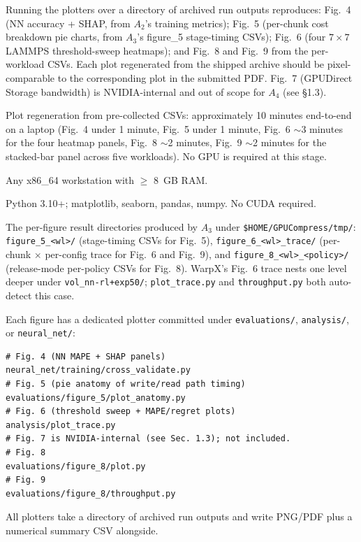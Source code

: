 \documentclass[conference]{IEEEtran}
\begin{document}
Running the plotters over a directory of archived run outputs
reproduces:
Fig.~4 (NN accuracy + SHAP, from $A_2$'s training metrics);
Fig.~5 (per-chunk cost breakdown pie charts, from $A_3$'s
figure\_5 stage-timing CSVs);
Fig.~6 (four $7 \times 7$ LAMMPS threshold-sweep heatmaps);
and Fig.~8 and Fig.~9 from the per-workload CSVs. Each plot
regenerated from the shipped archive should be
pixel-comparable to the corresponding plot in the submitted
PDF. Fig.~7 (GPUDirect Storage bandwidth) is NVIDIA-internal
and out of scope for $A_4$ (see \S1.3).

Plot regeneration from pre-collected CSVs: approximately 10
minutes end-to-end on a laptop (Fig.~4 under 1 minute, Fig.~5
under 1 minute, Fig.~6 $\sim$3 minutes for the four heatmap
panels, Fig.~8 $\sim$2 minutes, Fig.~9 $\sim$2 minutes for the
stacked-bar panel across five workloads). No GPU is required
at this stage.

\artin

Any x86\_64 workstation with $\geq$ 8~GB RAM.

Python 3.10+; matplotlib, seaborn, pandas, numpy. No CUDA
required.

The per-figure result directories produced by $A_3$ under
\texttt{\$HOME/GPUCompress/tmp/}:
\texttt{figure\_5\_<wl>/} (stage-timing CSVs for Fig.~5),
\texttt{figure\_6\_<wl>\_trace/} (per-chunk $\times$
per-config trace for Fig.~6 and Fig.~9), and
\texttt{figure\_8\_<wl>\_<policy>/} (release-mode per-policy
CSVs for Fig.~8). WarpX's Fig.~6 trace nests one level deeper
under \texttt{vol\_nn-rl+exp50/}; \texttt{plot\_trace.py} and
\texttt{throughput.py} both auto-detect this case.

Each figure has a dedicated plotter committed under
\texttt{evaluations/}, \texttt{analysis/}, or
\texttt{neural\_net/}:
\begin{verbatim}
# Fig. 4 (NN MAPE + SHAP panels)
neural_net/training/cross_validate.py
# Fig. 5 (pie anatomy of write/read path timing)
evaluations/figure_5/plot_anatomy.py
# Fig. 6 (threshold sweep + MAPE/regret plots)
analysis/plot_trace.py
# Fig. 7 is NVIDIA-internal (see Sec. 1.3); not included.
# Fig. 8
evaluations/figure_8/plot.py
# Fig. 9
evaluations/figure_8/throughput.py
\end{verbatim}
All plotters take a directory of archived run outputs and
write PNG/PDF plus a numerical summary CSV alongside.
\end{document}
